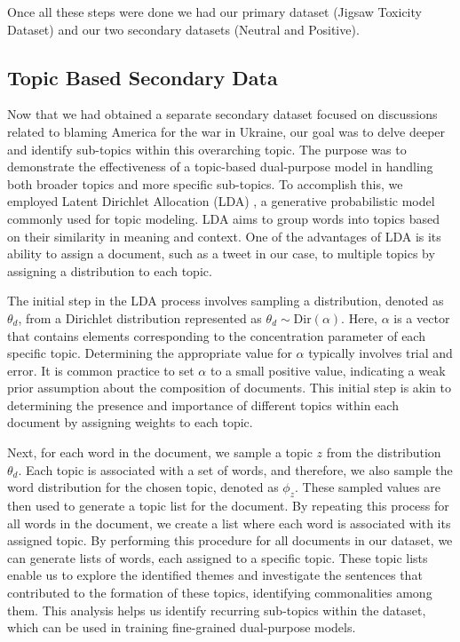 Once all these steps were done we had our primary dataset (Jigsaw Toxicity Dataset) and our two secondary datasets (Neutral and Positive).

\subsection{Topic Based Secondary Data}
\label{topic_based_sec_data}

Now that we had obtained a separate secondary dataset focused on discussions related to blaming America for the war in Ukraine, our goal was to delve deeper and identify sub-topics within this overarching topic. The purpose was to demonstrate the effectiveness of a topic-based dual-purpose model in handling both broader topics and more specific sub-topics. To accomplish this, we employed Latent Dirichlet Allocation (LDA) \cite{lda}, a generative probabilistic model commonly used for topic modeling. LDA aims to group words into topics based on their similarity in meaning and context. One of the advantages of LDA is its ability to assign a document, such as a tweet in our case, to multiple topics by assigning a distribution to each topic.

The initial step in the LDA process involves sampling a distribution, denoted as $\theta_{d}$, from a Dirichlet distribution represented as $\theta_{d} \sim \text{Dir}(\alpha)$. Here, $\alpha$ is a vector that contains elements corresponding to the concentration parameter of each specific topic. Determining the appropriate value for $\alpha$ typically involves trial and error. It is common practice to set $\alpha$ to a small positive value, indicating a weak prior assumption about the composition of documents. This initial step is akin to determining the presence and importance of different topics within each document by assigning weights to each topic.

Next, for each word in the document, we sample a topic $z$ from the distribution $\theta_{d}$. Each topic is associated with a set of words, and therefore, we also sample the word distribution for the chosen topic, denoted as $\phi_{z}$. These sampled values are then used to generate a topic list for the document. By repeating this process for all words in the document, we create a list where each word is associated with its assigned topic. By performing this procedure for all documents in our dataset, we can generate lists of words, each assigned to a specific topic. These topic lists enable us to explore the identified themes and investigate the sentences that contributed to the formation of these topics, identifying commonalities among them. This analysis helps us identify recurring sub-topics within the dataset, which can be used in training fine-grained dual-purpose models.

